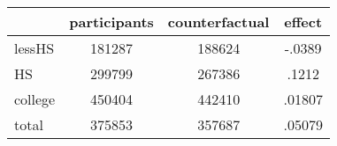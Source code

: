 \begin{table}[htbp]
\begin{tabular}{lccc} \hline \hline
 & participants  & counterfactual  & effect  \\  \hline 
lessHS &    181287 &    188624 &    -.0389 \\  
HS &    299799 &    267386 &     .1212 \\  
college &    450404 &    442410 &    .01807 \\  
total &    375853 &    357687 &    .05079 \\  
\hline \hline \end{tabular}
\end{table}
